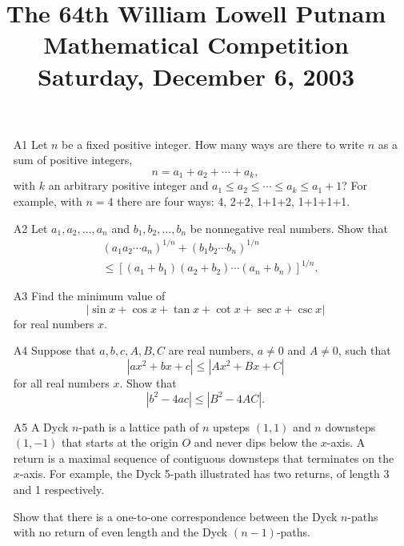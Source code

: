 \documentclass[amssymb,twocolumn,pra,10pt,aps]{revtex4-1}
\begin{document}
\title{The 64th William Lowell Putnam Mathematical Competition \\
    Saturday, December 6, 2003}
\maketitle

\begin{itemize}

\item[A1]
Let $n$ be a fixed positive integer. How many ways are there to write  $n$
as a sum of positive integers,  
\[
n = a_1 + a_2 + \cdots + a_k,
\]
with  $k$  an
arbitrary positive integer and  $a_1 \le a_2 \le \cdots \le a_k \le a_1  + 1$?
For example, with $n=4$ there are four ways: 4, 2+2, 1+1+2, 1+1+1+1.

\item[A2]
Let $a_1, a_2, \dots, a_n$  and  $b_1, b_2, \dots, b_n$
be nonnegative real numbers.
Show that
\begin{align*}
& (a_1 a_2 \cdots a_n)^{1/n} + (b_1 b_2 \cdots b_n)^{1/n} \\
&\leq [(a_1+b_1) (a_2+b_2) \cdots (a_n + b_n) ]^{1/n}.
\end{align*}

\item[A3]
Find the minimum value of
\[
  | \sin x + \cos x + \tan x + \cot x + \sec x + \csc x |
\]
for real numbers  $x$.

\item[A4]
Suppose that $a,b,c,A,B,C$  are real numbers, $a\ne 0$ and $A \ne 0$, such that
\[
          | a x^2 + b x + c | \leq | A x^2 + B x + C |
\]
for all real numbers  $x$. Show that
\[
              | b^2 - 4 a c | \leq | B^2 - 4 A C |.
\]

\item[A5]
A Dyck $n$-path is a lattice path of  $n$  upsteps $(1,1)$ and  $n$
  downsteps $(1,-1)$
that starts at the origin  $O$  and never dips below the  $x$-axis.
A return is a maximal sequence of contiguous downsteps that terminates
on the  $x$-axis. For example, the Dyck 5-path illustrated has two returns,
of length  3  and  1  respectively.
\begin{center}
\end{center}
Show that there is a one-to-one correspondence between the Dyck  $n$-paths
with no return of even length and the Dyck $(n-1)$-paths.


\end{itemize}
\end{document}
